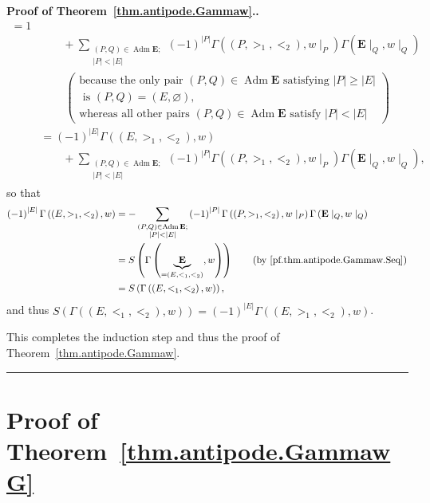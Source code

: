 \documentclass[numbers=enddot,12pt,final,onecolumn,notitlepage,abstracton]{scrartcl}%
\theoremstyle{definition}
\newenvironment{proof}[1][Proof]{\noindent\textbf{#1.} }{\ \rule{0.5em}{0.5em}}
\let\sumnonlimits\sum
\renewcommand{\sum}{\sumnonlimits\limits}
\newcommand{\Adm}{\operatorname{Adm}}
\newcommand{\EE}{{\mathbf{E}}}
\begin{document}
\begin{proof}[Proof of Theorem~\ref{thm.antipode.Gammaw}.]
\begin{align*}
{           =1}
\\
&\qquad + \sum_{\substack{\left(P, Q\right) \in \Adm \EE ; \\
                  \left|P\right| < \left|E\right|}}
\left(-1\right)^{\left|P\right|}
\Gamma\left(\left(P, >_1, <_2\right), w\mid_P\right)
\Gamma\left(\EE\mid_Q, w\mid_Q\right)
\\
& \ \ \ \ \ \ \ \ \ \ \left(
 \begin{array}{c}
  \text{because the only pair } \left(P, Q\right) \in \Adm \EE
  \text{ satisfying } \left|P\right| \geq \left|E\right| \\
  \text{ is } \left(P, Q\right) = \left(E, \varnothing\right)
  \text{,} \\
  \text{whereas all other pairs } \left(P, Q\right) \in \Adm \EE
  \text{ satisfy } \left|P\right| < \left|E\right|
 \end{array}
\right) \\
&= \left(-1\right)^{\left|E\right|} \Gamma\left(\left(E, >_1, <_2\right), w\right) \\
& \qquad
+ \sum_{\substack{\left(P, Q\right) \in \Adm \EE ; \\
                  \left|P\right| < \left|E\right|}}
\left(-1\right)^{\left|P\right|}
\Gamma\left(\left(P, >_1, <_2\right), w\mid_P\right)
\Gamma\left(\EE\mid_Q, w\mid_Q\right) ,
\end{align*}
so that
\begin{align*}
\left(-1\right)^{\left|E\right|} \Gamma\left(\left(E, >_1, <_2\right), w\right)
&= - \sum_{\substack{\left(P, Q\right) \in \Adm \EE ; \\
                  \left|P\right| < \left|E\right|}}
\left(-1\right)^{\left|P\right|}
\Gamma\left(\left(P, >_1, <_2\right), w\mid_P\right)
\Gamma\left(\EE\mid_Q, w\mid_Q\right) \\
&= S\left(\Gamma\left(\underbrace{\EE}_{=\left(E, <_1, <_2\right)}, w\right)\right)
\qquad \left(\text{by \eqref{pf.thm.antipode.Gammaw.Seq}}\right) \\
&= S\left(\Gamma\left(\left(E, <_1, <_2\right), w\right)\right) ,
\end{align*}
and thus
$S\left(\Gamma\left(\left(E, <_1, <_2\right), w\right) \right)
= \left(-1\right)^{\left|E\right|}
\Gamma\left(\left(E, >_1, <_2\right), w\right)$.

This completes the
induction step and thus the proof of Theorem~\ref{thm.antipode.Gammaw}.
\end{proof}

\section{Proof of Theorem~\ref{thm.antipode.GammawG}}
\label{sect.proofG}
\end{document}
